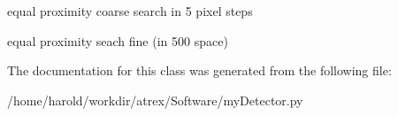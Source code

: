 equal proximity coarse search in 5 pixel steps 

equal proximity seach fine (in 500 space) 

The documentation for this class was generated from the following file\-:\begin{DoxyCompactItemize}
\item 
/home/harold/workdir/atrex/\-Software/my\-Detector.\-py\end{DoxyCompactItemize}
